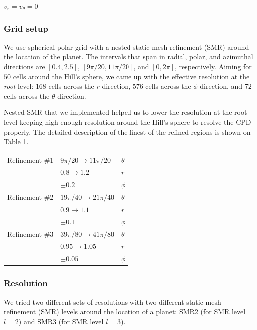 \documentclass[twocolumn]{aastex631}
\begin{document}
$v_r=v_\theta=0$

\subsubsection{Grid setup}
We use spherical-polar grid with a nested static mesh refinement (SMR) around the location of the planet. The intervals that span in radial, polar, and azimuthal
directions are $[0.4, 2.5]$, $[9\pi/20, 11\pi/20]$, and $[0, 2\pi]$, respectively. Aiming for $50$ cells around the Hill's sphere, we came up with the 
effective resolution at the \emph{root} level: $168$ cells across the $r$-direction, $576$ cells across the $\phi$-direction, 
and $72$ cells across the $\theta$-direction.

Nested SMR that we implemented helped us to lower the resolution at the root level keeping high enough resolution around the Hill's 
sphere to resolve the CPD properly. The detailed description of the finest of the refined regions is shown on Table \ref{tab:smr}.
\begin{table}[]
    \label{tab:smr}
    \begin{tabular}{lll}
                   &                                 &          \\ \hline \hline
    Refinement \#1 & $9\pi/20 \rightarrow 11\pi/20$  & $\theta$ \\
                   & $0.8 \rightarrow 1.2$           & $r$      \\
                   & $\pm 0.2$                       & $\phi$   \\ \hline
    Refinement \#2 & $19\pi/40 \rightarrow 21\pi/40$ & $\theta$ \\
                   & $0.9 \rightarrow 1.1$           & $r$      \\
                   & $\pm 0.1$                       & $\phi$   \\ \hline
    Refinement \#3 & $39\pi/80 \rightarrow 41\pi/80$ & $\theta$ \\
                   & $0.95 \rightarrow 1.05$         & $r$      \\ \hline
                   & $\pm 0.05$                      & $\phi$  
    \end{tabular}
    \end{table}


\subsubsection{Resolution}
We tried two different sets of resolutions with two different static mesh refinement (SMR) levels around the location of a planet: SMR2 (for SMR level $l=2$) and SMR3 (for SMR level $l=3$).
\end{document}

